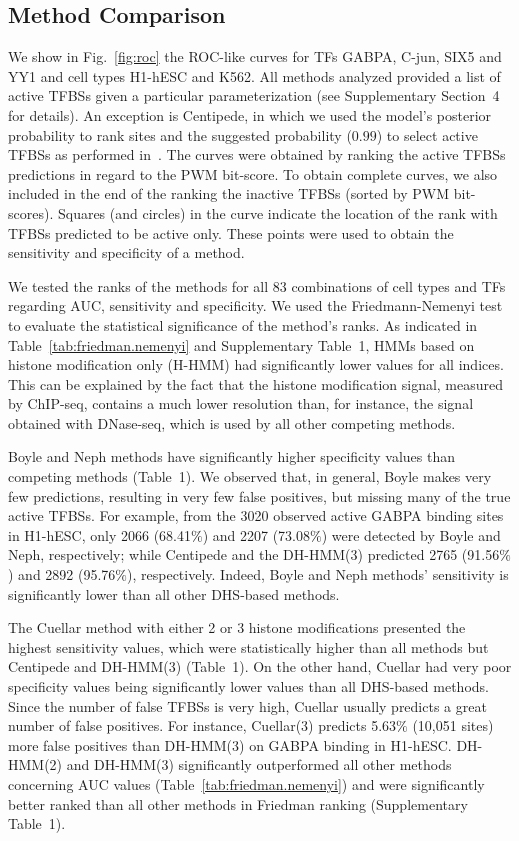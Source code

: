 \documentclass{bioinfo}
\begin{document}
\subsection{Method Comparison}
\label{sec:prediction.accuracy}

We show in Fig.~\ref{fig:roc} the {\color{red} ROC-like} curves for TFs GABPA, C-jun, SIX5 and YY1 and
cell types H1-hESC and K562.  {\color{red} All methods analyzed provided a list of active TFBSs given a particular parameterization
(see Supplementary Section~4 for details). An exception is Centipede, in which we used
the model's posterior probability to rank sites and the suggested probability ($0.99$)
to select active TFBSs as performed in~\cite{pique2011}. The curves were obtained by ranking the active TFBSs
predictions in regard to the PWM bit-score. To obtain complete curves, we also included
in the end of the ranking the inactive TFBSs (sorted by PWM bit-scores). Squares (and circles) in the
curve indicate the location of the rank with TFBSs predicted to be active only. These points were used to obtain the sensitivity and specificity of a method}.

We tested the ranks of the methods for all 83
combinations of cell types and TFs regarding AUC, sensitivity and specificity. We used the
Friedmann-Nemenyi test to evaluate the statistical significance of the method's ranks.
As indicated in Table~\ref{tab:friedman.nemenyi} and Supplementary Table~1, HMMs
based on histone modification only (H-HMM) had significantly lower values for all indices. This can
be explained by the fact that the histone modification signal, measured by ChIP-seq,
contains a much lower resolution than, for instance, the signal obtained with DNase-seq,
which is used by all other competing methods.

Boyle and Neph methods have significantly higher specificity values than competing
methods {\color{red} (Table~1)}. We observed that, in general, Boyle makes very few predictions,
resulting in very few false positives, but missing many of the true active TFBSs.
For example, from the 3020 observed active GABPA binding sites in H1-hESC, only 2066
(68.41$\%$) and 2207 (73.08$\%$) were detected by Boyle and Neph, respectively; while
Centipede and the DH-HMM(3) predicted 2765 (91.56$\%$) and 2892 (95.76$\%$), respectively.
Indeed, Boyle and Neph methods' sensitivity is significantly lower than all other DHS-based
methods.

The Cuellar method with either 2 or 3 histone modifications presented the highest sensitivity values,
which were statistically higher than all methods but Centipede and DH-HMM(3) {\color{red} (Table~1)}. On the other
hand, Cuellar had very poor specificity values being significantly lower values than all
DHS-based methods. Since the number of false TFBSs is very high, Cuellar usually predicts
a great number of false positives. For instance, Cuellar(3) predicts 5.63$\%$ (10,051 sites)
more false positives than DH-HMM(3) on GABPA binding in H1-hESC. DH-HMM(2) and DH-HMM(3)
significantly outperformed all other methods concerning AUC values (Table~\ref{tab:friedman.nemenyi})
and were significantly better ranked than all other methods in Friedman ranking
(Supplementary Table~1).
\end{document}
